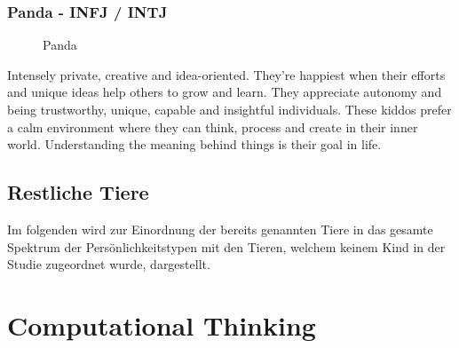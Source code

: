 \subsubsection{Panda - INFJ / INTJ}
\begin{figure}[htbp!]
	\centering
	\caption[Panda]{Panda \cite{knowAndLove}}
	\label{img:Panda}
\end{figure}
	Intensely private, creative and idea-oriented. They're happiest when their efforts and unique ideas help others to grow and learn. They appreciate autonomy and being trustworthy, unique, capable and insightful individuals. These kiddos prefer a calm environment where they can think, process and create in their inner world. Understanding the meaning behind things is their goal in life. \\
\subsection{Restliche Tiere}
Im folgenden wird zur Einordnung der bereits genannten Tiere in das gesamte Spektrum der Persönlichkeitstypen mit den Tieren, welchem keinem Kind in der Studie zugeordnet wurde, dargestellt.



\section{Computational Thinking}

